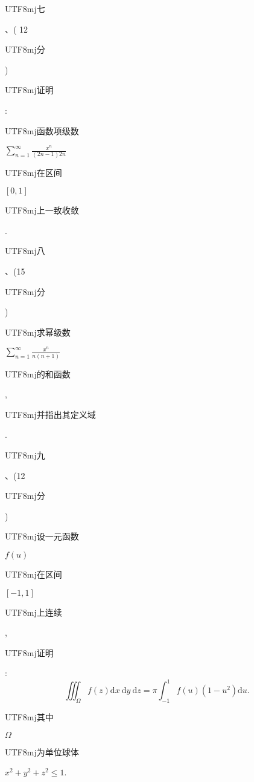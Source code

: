 \documentclass[10pt]{article}
\begin{document}
\begin{CJK}{UTF8}{mj}七\end{CJK}、( 12 \begin{CJK}{UTF8}{mj}分\end{CJK}) \begin{CJK}{UTF8}{mj}证明\end{CJK}: \begin{CJK}{UTF8}{mj}函数项级数\end{CJK} $\sum_{n=1}^{\infty} \frac{x^{n}}{(2 n-1) 2 n}$ \begin{CJK}{UTF8}{mj}在区间\end{CJK} $[0,1]$ \begin{CJK}{UTF8}{mj}上一致收敛\end{CJK}.

\begin{CJK}{UTF8}{mj}八\end{CJK}、(15 \begin{CJK}{UTF8}{mj}分\end{CJK}) \begin{CJK}{UTF8}{mj}求幂级数\end{CJK} $\sum_{n=1}^{\infty} \frac{x^{n}}{n(n+1)}$ \begin{CJK}{UTF8}{mj}的和函数\end{CJK}, \begin{CJK}{UTF8}{mj}并指出其定义域\end{CJK}.

\begin{CJK}{UTF8}{mj}九\end{CJK}、(12 \begin{CJK}{UTF8}{mj}分\end{CJK}) \begin{CJK}{UTF8}{mj}设一元函数\end{CJK} $f(u)$ \begin{CJK}{UTF8}{mj}在区间\end{CJK} $[-1,1]$ \begin{CJK}{UTF8}{mj}上连续\end{CJK}, \begin{CJK}{UTF8}{mj}证明\end{CJK}:
$$
\iiint_{\Omega} f(z) \mathrm{d} x \mathrm{~d} y \mathrm{~d} z=\pi \int_{-1}^{1} f(u)\left(1-u^{2}\right) \mathrm{d} u .
$$
\begin{CJK}{UTF8}{mj}其中\end{CJK} $\Omega$ \begin{CJK}{UTF8}{mj}为单位球体\end{CJK} $x^{2}+y^{2}+z^{2} \leqslant 1$.
\end{document}
